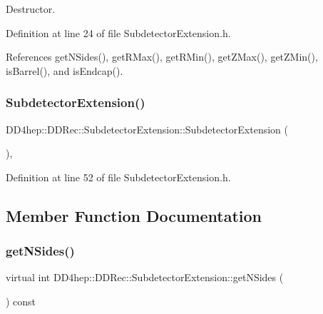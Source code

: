 Destructor. 



Definition at line 24 of file Subdetector\+Extension.\+h.



References get\+N\+Sides(), get\+R\+Max(), get\+R\+Min(), get\+Z\+Max(), get\+Z\+Min(), is\+Barrel(), and is\+Endcap().

\hypertarget{class_d_d4hep_1_1_d_d_rec_1_1_subdetector_extension_ae04b137994a497fa056f2cfc84aa0eb9}{}\label{class_d_d4hep_1_1_d_d_rec_1_1_subdetector_extension_ae04b137994a497fa056f2cfc84aa0eb9} 
\subsubsection{\texorpdfstring{Subdetector\+Extension()}{SubdetectorExtension()}}
{\footnotesize\ttfamily D\+D4hep\+::\+D\+D\+Rec\+::\+Subdetector\+Extension\+::\+Subdetector\+Extension (\begin{DoxyParamCaption}{ }\end{DoxyParamCaption})\hspace{0.3cm}{\ttfamily [inline]}, {\ttfamily [protected]}}



Definition at line 52 of file Subdetector\+Extension.\+h.



\subsection{Member Function Documentation}
\hypertarget{class_d_d4hep_1_1_d_d_rec_1_1_subdetector_extension_a7bed401e919e8eaaf2dfdf8fe89a3697}{}\label{class_d_d4hep_1_1_d_d_rec_1_1_subdetector_extension_a7bed401e919e8eaaf2dfdf8fe89a3697} 
\subsubsection{\texorpdfstring{get\+N\+Sides()}{getNSides()}}
{\footnotesize\ttfamily virtual int D\+D4hep\+::\+D\+D\+Rec\+::\+Subdetector\+Extension\+::get\+N\+Sides (\begin{DoxyParamCaption}{ }\end{DoxyParamCaption}) const\hspace{0.3cm}{\ttfamily [pure virtual]}}



